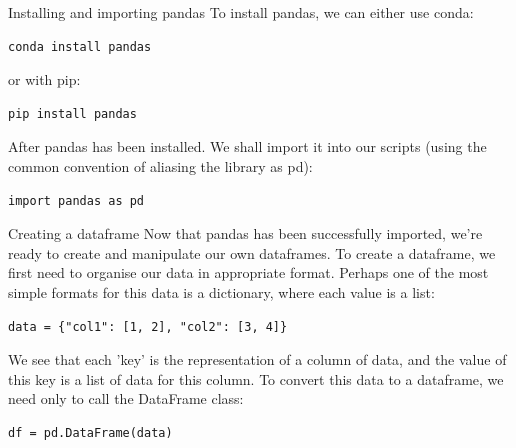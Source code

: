 \documentclass[10pt]{beamer}
\begin{document}
\begin{frame}[label={sec:org8264db7},fragile]{Installing and importing pandas}
 To install pandas, we can either use conda:

\begin{verbatim}
conda install pandas
\end{verbatim}

or with pip:

\begin{verbatim}
pip install pandas
\end{verbatim}

After pandas has been installed. We shall import it into our scripts (using the
common convention of aliasing the library as pd):

\begin{verbatim}
import pandas as pd
\end{verbatim}
\end{frame}

\begin{frame}[label={sec:org24d7eb7},fragile]{Creating a dataframe}
 Now that pandas has been successfully imported, we're ready to create and
manipulate our own dataframes. To create a dataframe, we first need to organise
our data in appropriate format. Perhaps one of the most simple formats for this
data is a dictionary, where each value is a list:

\begin{verbatim}
data = {"col1": [1, 2], "col2": [3, 4]}
\end{verbatim}

We see that each 'key' is the representation of a column of data, and the value
of this key is a list of data for this column. To convert this data to a
dataframe, we need only to call the DataFrame class:

\begin{verbatim}
df = pd.DataFrame(data)
\end{verbatim}
\end{frame}
\end{document}

